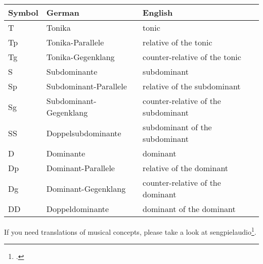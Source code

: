 \documentclass[
  DIV=calc,
  BCOR=5mm,
  12pt,
  headings=small,
  oneside,
  abstract=true,
  toc=bib,
  xcolor=dvipsnames,
  openany,
  ngerman,english]{scrartcl}
\begin{document}
\begin{tabular}{|l|l|l|}
\hline
Symbol & German & English \tabularnewline
\hline
\hline
T      & Tonika                 & tonic \\
\hline
Tp     & Tonika-Parallele       & relative of the tonic \\
\hline
Tg     & Tonika-Gegenklang      & counter-relative of the tonic \\
\hline
S      & Subdominante           & subdominant \\
\hline
Sp     & Subdominant-Parallele  & relative of the subdominant \\
\hline
Sg     & Subdominant-Gegenklang & counter-relative of the subdominant \\
\hline
SS     & Doppelsubdominante     & subdominant of the subdominant \\
\hline
D      & Dominante              & dominant \\
\hline
Dp     & Dominant-Parallele     & relative of the dominant \\
\hline
Dg     & Dominant-Gegenklang    & counter-relative of the dominant \\
\hline
DD     & Doppeldominante        & dominant of the dominant \\
\hline
\hline

\end{tabular}

If you need translations of musical concepts, please take a look at
sengpielaudio\footcite[cf.][\nopage wp]{sengpielaudio2019a}.















%
\printnomenclature


\end{document}
